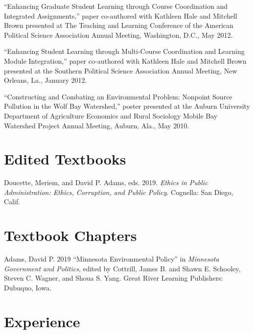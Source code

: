 \documentclass[11pt,letterpaper]{article}
\renewenvironment{itemize}{
  \begin{list}{}{
    \setlength{\leftmargin}{1.5em}
    \setlength{\itemsep}{0.25em}
    \setlength{\parskip}{0pt}
    \setlength{\parsep}{0.25em}
  }
}{
  \end{list}
}
\begin{document}
\begin{itemize}
		\item ``Enhancing Graduate Student Learning through Course Coordination and Integrated Assignments,'' paper co-authored with Kathleen Hale and Mitchell Brown presented at The Teaching and Learning Conference of the American Political Science Association Annual Meeting, Washington, D.C., May 2012.
		
		\item ``Enhancing Student Learning through Multi-Course Coordination and Learning Module Integration,'' paper co-authored with Kathleen Hale and Mitchell Brown presented at the Southern Political Science Association Annual Meeting, New Orleans, La., January 2012.
		
		\item ``Constructing and Combating an Environmental Problem: Nonpoint Source Pollution in the Wolf Bay Watershed,'' poster presented at the Auburn University Department of Agriculture Economics and Rural Sociology Mobile Bay Watershed Project Annual Meeting, Auburn, Ala., May 2010.
	\end{itemize}
	
\section*{Edited Textbooks}
	\begin{itemize}
		\item Doucette, Meriem, and David P. Adams, eds. 2019. \emph{Ethics in Public Administration: Ethics, Corruption, and Public Policy}. Cognella: San Diego, Calif. 
	\end{itemize}

\section*{Textbook Chapters}
	\begin{itemize}
		\item Adams, David P. 2019 ``Minnesota Environmental Policy'' in \textit{Minnesota Government and Politics}, edited by Cottrill, James B. and Shawn E. Schooley, Steven C. Wagner, and Shoua S. Yang. Great River Learning Publishers: Dubuquo, Iowa. 
	\end{itemize}
		
\section*{Experience}
\end{document}
